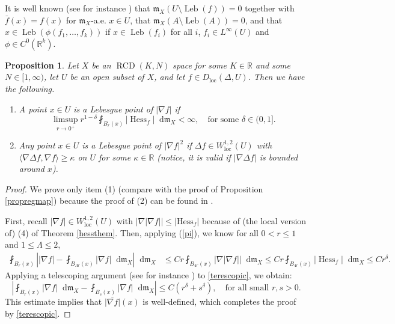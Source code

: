 \documentclass[11pt,reqno]{amsart}
\newtheorem{proposition}[theorem]{Proposition}
\theoremstyle{definition}
\numberwithin{equation}{section}
\newcommand{\di}{\mathop{}\!\mathrm{d}}
\newcommand{\meas}{\mathfrak{m}}
\DeclareMathOperator{\Hess}{Hess}
\DeclareMathOperator{\Leb}{Leb}
\DeclareMathOperator{\loc}{loc}
\DeclareMathOperator{\RCD}{RCD}
\begin{document}
  It is well known (see for instance \cite{BjornBjorn, HKPST}) that $\meas_X(U \setminus \Leb (f))=0$ together with  $\bar f(x)=f(x)$ for $\meas_X$-a.e. $x \in U$, that $\meas_X(A\setminus \Leb (A))=0$, and that $x \in \Leb (\phi (f_1, \ldots, f_k))$ if $x \in \Leb (f_i)$ for all $i$, $f_i \in L^{\infty}(U)$ and $\phi \in C^0(\mathbb{R}^k)$.
    

\begin{proposition}\label{proplebes}
Let $X$ be an $\RCD(K, N)$ space for some $K \in \mathbb{R}$ and some $N \in [1, \infty)$, let $U$ be an open subset of $X$, and let
     $f \in D_{\loc}(\Delta, U)$. Then we have the following. 
    \begin{enumerate}
    \item A point $x \in U$ is a Lebesgue point of $|\nabla f|$ if  
    \begin{equation}
        \limsup_{r \to 0^+}r^{1-\delta}\fint_{B_r(x)}|\Hess_f|\di \meas_X<\infty, \quad \text{for some $\delta \in (0, 1]$.}
    \end{equation}
        \item Any point $x \in U$ is a Lebesgue point of $|\nabla f|^2$ if $\Delta f\in W^{1,2}_{\loc}(U)$ with $\langle \nabla \Delta f, \nabla f \rangle \ge \kappa$ on $U$ for some $\kappa \in \mathbb{R}$ (notice, it is valid if $|\nabla \Delta f|$ is bounded around $x$). 
    \end{enumerate}
\end{proposition}
\begin{proof}
     We prove only item (1) (compare with the proof of Proposition \ref{propregmap}) because the proof of (2) can be found in \cite[Remark 2.10]{BPS2}.

 First, recall $|\nabla f| \in W^{1,2}_{\loc}(U)$ with $|\nabla |\nabla f|| \le |\mathrm{Hess}_f|$ because of (the local version of) (4) of Theorem \ref{hessthem}.  Then, applying (\ref{pi}), we know for all $0<r \le 1$ and $1 \le \Lambda \le 2$,
\begin{align}\label{terescopic}
    \fint_{B_r(x)}\left| |\nabla f|-\fint_{B_{\Lambda r}(x)}|\nabla f|\di \meas_X\right|\di \meas_X &\le C r \fint_{B_{4 r}(x)}|\nabla |\nabla f||\di \meas_X  \le C r\fint_{B_{4r}(x)}|\Hess_f|\di \meas_X  \le Cr^{\delta}.
\end{align}
 Applying a telescoping argument (see for instance \cite[Remark 4.20]{Chee}) to \eqref{terescopic}, we obtain:
\begin{equation}
    \left|\fint_{B_r(x)}|\nabla f|\di \meas_X-\fint_{B_s(x)}|\nabla f|\di \meas_X \right| \le C(r^{\delta}+s^{\delta}), \quad \text{for all small $r,s>0$}.
\end{equation}
This estimate implies that $\overline{|\nabla f|}(x)$ is well-defined, which completes the proof by \eqref{terescopic}.
\end{proof}
\end{document}
